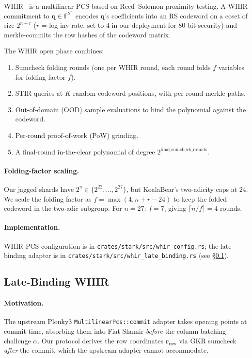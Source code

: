 WHIR~\cite{whir2024} is a multilinear PCS based on Reed--Solomon
proximity testing.  A WHIR commitment to $\mathbf{q} \in
\mathbb{F}^{2^n}$ encodes $\mathbf{q}$'s coefficients into an RS
codeword on a coset of size $2^{n+r}$ ($r$ = log-inv-rate, set to $4$
in our deployment for $80$-bit security) and merkle-commits the row
hashes of the codeword matrix.

The WHIR open phase combines:
\begin{enumerate}
  \item Sumcheck folding rounds (one per WHIR round, each round
        folds $f$ variables for folding-factor $f$).
  \item STIR queries at $K$ random codeword positions, with
        per-round merkle paths.
  \item Out-of-domain (OOD) sample evaluations to bind the
        polynomial against the codeword.
  \item Per-round proof-of-work (PoW) grinding.
  \item A final-round in-the-clear polynomial of degree
        $2^{\mathrm{final\_sumcheck\_rounds}}$.
\end{enumerate}

\paragraph{Folding-factor scaling.}  Our jagged shards have
$2^n \in \{2^{22}, \ldots, 2^{27}\}$, but KoalaBear's two-adicity
caps at $24$.  We scale the folding factor as
$f = \max(4, n + r - 24)$ to keep the folded codeword in the
two-adic subgroup.  For $n = 27$: $f = 7$, giving
$\lceil n / f \rceil = 4$ rounds.

\paragraph{Implementation.}
WHIR PCS configuration is in
\texttt{crates/stark/src/whir\_config.rs}; the late-binding
adapter is in \texttt{crates/stark/src/whir\_late\_binding.rs}
(see \S\ref{sec:design-late-binding}).

\subsection{Late-Binding WHIR}
\label{sec:design-late-binding}

\paragraph{Motivation.}
The upstream Plonky3 \texttt{MultilinearPcs::commit} adapter takes
opening points at commit time, absorbing them into Fiat-Shamir
\emph{before} the column-batching challenge $\alpha$.  Our protocol
derives the row coordinates $\mathbf{r}_{\mathrm{row}}$ via GKR sumcheck
\emph{after} the commit, which the upstream adapter cannot accommodate.

